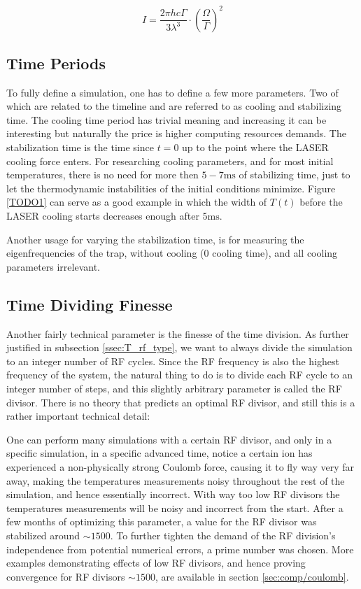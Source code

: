\begin{equation}
	I = \frac{2\pi h c \Gamma}{3 \lambda^3} \cdot \left(\frac{\Omega}{\Gamma}\right)^2
\end{equation}

\subsection{Time Periods}

To fully define a simulation, one has to define a few more parameters. Two of which are related to the timeline and are referred to as cooling and stabilizing time. The cooling time period has trivial meaning and increasing it can be interesting but naturally the price is higher computing resources demands. The stabilization time is the time since $t=0$ up to the point where the LASER cooling force enters. For researching cooling parameters, and for most initial temperatures, there is no need for more then $5-7\mathrm{ms}$ of stabilizing time, just to let the thermodynamic instabilities of the initial conditions minimize. Figure \ref{TODO1} can serve as a good example in which the width of $T(t)$ before the LASER cooling starts decreases enough after $5 \mathrm{ms}$.

\label{TODO1}

Another usage for varying the stabilization time, is for measuring the eigenfrequencies of the trap, without cooling ($0$ cooling time), and all cooling parameters irrelevant.

\subsection{Time Dividing Finesse}

Another fairly technical parameter is the finesse of the time division. As further justified in subsection \ref{ssec:T_rf_type}, we want to always divide the simulation to an integer number of RF cycles. Since the RF frequency is also the highest frequency of the system, the natural thing to do is to divide each RF cycle to an integer number of steps, and this slightly arbitrary parameter is called the RF divisor. There is no theory that predicts an optimal RF divisor, and still this is a rather important technical detail:

One can perform many simulations with a certain RF divisor, and only in a specific simulation, in a specific advanced time, notice a certain ion has experienced a non-physically strong Coulomb force, causing it to fly way very far away, making the temperatures measurements noisy throughout the rest of the simulation, and hence essentially incorrect. With way too low RF divisors the temperatures measurements will be noisy and incorrect from the start. After a few months of optimizing this parameter, a value for the RF divisor was stabilized around $\sim 1500$. To further tighten the demand of the RF division's independence from potential numerical errors, a prime number was chosen.\cite{primesieve} More examples demonstrating effects of low RF divisors, and hence proving convergence for RF divisors $\sim 1500$, are available in section \ref{sec:comp/coulomb}.


